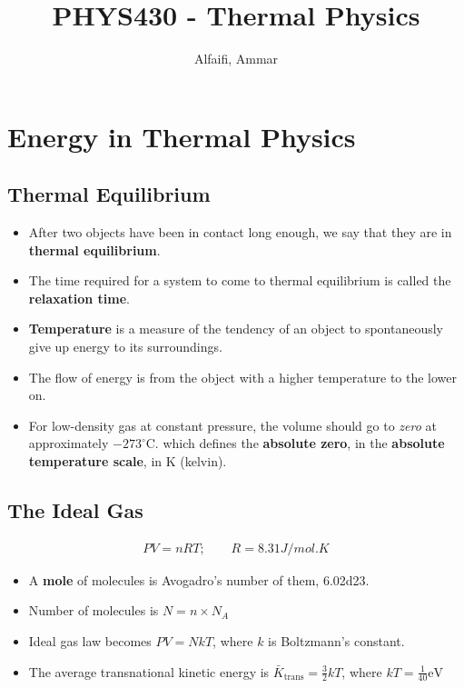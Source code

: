 \documentclass{book}
\title{PHYS430 - Thermal Physics}
\author{Alfaifi, Ammar}
\date{}
\begin{document}
\maketitle

\chapter{Energy in Thermal Physics}


\section{Thermal Equilibrium}%
\label{sec:thermal-equilibrium}

\begin{itemize}
  \item After two objects have been in contact long enough, we say that they are in \textbf{thermal equilibrium}.
  \item The time required for a system to come to thermal equilibrium is called the \textbf{relaxation time}.
  \item \textbf{Temperature} is a measure of the tendency of an object to spontaneously give up energy to its
        surroundings.
  \item The flow of energy is from the object with a higher temperature to the lower on.
  \item For low-density gas at constant pressure, the volume should go to \textit{zero} at
        approximately $-273^{\circ}$C. which defines the \textbf{absolute zero}, in the
        \textbf{absolute temperature scale}, in K (kelvin).
\end{itemize}

\section{The Ideal Gas}%
\label{sec:The Ideal Gas}
\begin{align}
  PV = nRT; \qquad R = \si{8.31}{J / mol . K}
\end{align}

\begin{itemize}
  \item A \textbf{mole} of molecules is Avogadro's number of them, \num{6.02d23}.
  \item Number of molecules is $N=n \times N_{A}$
  \item Ideal gas law becomes $PV = NkT$, where $k$ is Boltzmann's constant.
  \item The average transnational kinetic energy is $\bar{K}_{\text{trans}}= \frac{3}{2}kT$,
        where $kT = \frac{1}{40} \si{\electronvolt}$
\end{itemize}
\end{document}
